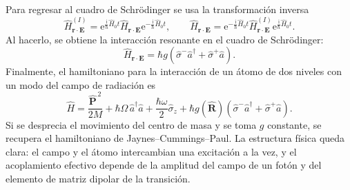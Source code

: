 \documentclass[11pt]{article}
\newcommand{\ii}{\mathrm{i}}
\newcommand{\ee}{\mathrm{e}}
\newcommand{\vb}[1]{\mathbf{#1}}
\newcommand{\adag}{\hat a^\dagger}
\newcommand{\splus}{\hat\sigma^+}
\newcommand{\sminus}{\hat\sigma^-}
\begin{document}
Para regresar al cuadro de Schr\"odinger se usa la transformaci\'on inversa
\begin{equation}
  \hat H_{\vb r\cdot\vb E}^{(I)}
  =
  \ee^{\frac{\ii}{\hbar}\hat H_0t}
  \hat H_{\vb r\cdot\vb E}
  \ee^{-\frac{\ii}{\hbar}\hat H_0t},
  \qquad
  \hat H_{\vb r\cdot\vb E}
  =
  \ee^{-\frac{\ii}{\hbar}\hat H_0t}
  \hat H_{\vb r\cdot\vb E}^{(I)}
  \ee^{\frac{\ii}{\hbar}\hat H_0t}.
\end{equation}
Al hacerlo, se obtiene la interacci\'on resonante en el cuadro de
Schr\"odinger:
\begin{equation}
  \hat H_{\vb r\cdot\vb E}
  =
  \hbar g
  \left(
    \sminus\adag
    +
    \splus\hat a
  \right).
\end{equation}
Finalmente, el hamiltoniano para la interacci\'on de un \'atomo de dos niveles
con un modo del campo de radiaci\'on es
\begin{equation}
  \boxed{
  \hat H
  =
  \frac{\hat{\vb P}^{\,2}}{2M}
  +
  \hbar\Omega\,\adag\hat a
  +
  \frac{\hbar\omega}{2}\hat\sigma_z
  +
  \hbar g(\hat{\vb R})
  \left(
    \sminus\adag
    +
    \splus\hat a
  \right).
  }
\end{equation}
Si se desprecia el movimiento del centro de masa y se toma \(g\) constante, se
recupera el hamiltoniano de Jaynes--Cummings--Paul. La estructura f\'isica queda
clara: el campo y el \'atomo intercambian una excitaci\'on a la vez, y el
acoplamiento efectivo depende de la amplitud del campo de un fot\'on y del
elemento de matriz dipolar de la transici\'on.
\end{document}
